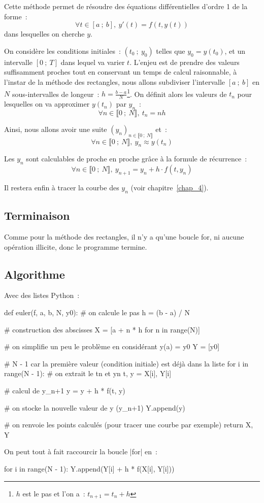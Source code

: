 		Cette méthode permet de résoudre des équations différentielles d'ordre 1 de la forme~:
		\[
			\forall t \in [a~;\ b],\ y'(t) = f(t, y(t))
		\]
		dans lesquelles on cherche $y$.
		
		On considère les conditions initiales~: $(t_0~;\ y_0)$ telles que $y_0 = y(t_0)$, et un intervalle $[0~;\ T]$ dans lequel va varier $t$. L'enjeu est de prendre des valeurs suffisamment proches tout en conservant un temps de calcul raisonnable, à l'instar de la méthode des rectangles, nous allons subdiviser l'intervalle $[a~;\ b]$ en $N$ sous-intervalles de longeur~: $h = \frac{b - a}{N}$\footnote{$h$ est le pas et l'on a~: $t_{n+1} = t_n + h$}. On définit alors les valeurs de $t_n$ pour lesquelles on va approximer $y(t_n)$ par $y_n$~:
		\[
			\forall n \in \llbracket 0~;\ N \rrbracket,\ t_n = nh
		\]
		
		Ainsi, nous allons avoir une suite $(y_n)_{n \in \llbracket 0~;\ N \rrbracket}$ et~:
		\[
			 \forall n \in \llbracket 0~;\ N \rrbracket,\ y_n \approx y(t_n)
		\]
		
		Les $y_n$ sont calculables de proche en proche grâce à la formule de récurrence~:
		\[
			\forall n \in \llbracket 0~;\ N \rrbracket,\ y_{n+1} = y_n + h \cdot f(t, y_n)
		\]
		
		Il restera enfin à tracer la courbe des $y_n$ (voir chapitre~\ref{chap_4}).
	
	\subsection{Terminaison}
		
		Comme pour la méthode des rectangles, il n'y a qu'une boucle for, ni aucune opération illicite, donc le programme termine.
		
	\subsection{Algorithme}
		
		Avec des listes Python~:
		\begin{pythoncode}
			def euler(f, a, b, N, y0):
				# on calcule le pas
				h = (b - a) / N
				
				# construction des abscisses
				X = [a + n * h for n in range(N)]
				
				# on simplifie un peu le problème en considérant y(a) = y0
				Y = [y0]
				
				# N - 1 car la première valeur (condition initiale) est déjà dans la liste
				for i in range(N - 1):
					# on extrait le tn et yn
					t, y = X[i], Y[i]
					
					# calcul de y_{n+1}
					y = y + h * f(t, y)
					
					# on stocke la nouvelle valeur de y (y_{n+1})
					Y.append(y)
				
				# on renvoie les points calculés (pour tracer une courbe par exemple)
				return X, Y
		\end{pythoncode}
		On peut tout à fait raccourcir la boucle \python|for| en~:
		\begin{pythoncode}
			for i in range(N - 1):
				Y.append(Y[i] + h * f(X[i], Y[i]))
		\end{pythoncode}
		
